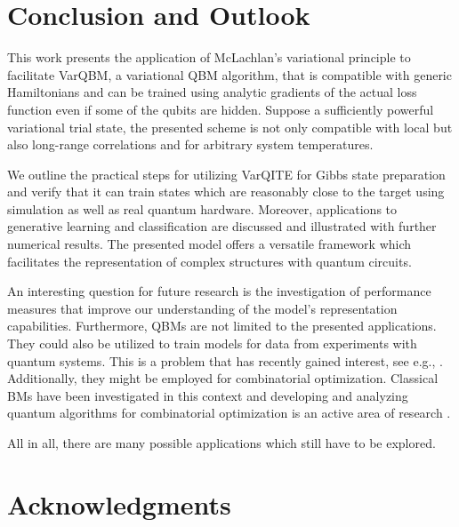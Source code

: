 \documentclass[twocolumn, aps, pra, superscriptaddress, floatfix]{revtex4}
\newcommand{\varqbm}{VarQBM}
\begin{document}
\section{Conclusion and Outlook}
\label{sec:discussion}

This work presents the application of McLachlan's variational principle to facilitate \varqbm, a variational QBM algorithm, that is compatible with generic Hamiltonians and can be trained using analytic gradients of the actual loss function even if some of the qubits are hidden. Suppose a sufficiently powerful variational trial state, the presented scheme is not only compatible with local but also long-range correlations and for arbitrary system temperatures.

We outline the practical steps for utilizing VarQITE for Gibbs state preparation and verify that it can train states which are reasonably close to the target using simulation as well as real quantum hardware.
Moreover, applications to generative learning and classification are discussed and illustrated with further numerical results. 
The presented model offers a versatile framework which facilitates the representation of complex structures with quantum circuits.

An interesting question for future research is the investigation of performance measures that improve our understanding of the model's representation capabilities. 
Furthermore, QBMs are not limited to the presented applications. They could also be utilized to train models for data from experiments with quantum systems. This is a problem that has recently gained interest, see e.g., \cite{LearningModels20}.  Additionally, they might be employed for combinatorial optimization. Classical BMs have been investigated in this context \cite{Spieksma1995} and developing and analyzing quantum algorithms for combinatorial optimization is an active area of research \cite{FarhiQAOA14, Barkoutsos20VQOCVaR}. 

All in all, there are many possible applications which still have to be explored.

\section{Acknowledgments}
\end{document}
